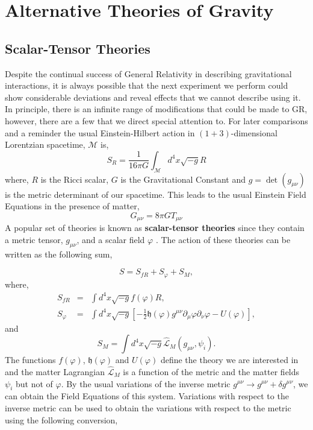 \chapter{Alternative Theories of Gravity}
\section{Scalar-Tensor Theories}
Despite the continual success of General Relativity in describing gravitational interactions, it is always possible that the next experiment we perform could show considerable deviations and reveal effects that we cannot describe using it. In principle, there is an infinite range of modifications that could be made to GR, however, there are a few that we direct special attention to. For later comparisons and a reminder the usual Einstein-Hilbert action in $(1+3)$-dimensional Lorentzian spacetime, $\mathcal{M}$ is,
\begin{equation}
    S_{R} = \frac{1}{16\pi G}\int_{\mathcal{M}} d^4 x\sqrt{-g}R
\end{equation}
where, $R$ is the Ricci scalar, $G$ is the Gravitational Constant and $g = \det(g_{\mu\nu})$ is the metric determinant of our spacetime. This leads to the usual Einstein Field Equations in the presence of matter, 
\begin{equation}\label{efes}
    G_{\mu\nu} = 8\pi GT_{\mu\nu}
\end{equation}
A popular set of theories is known as \textbf{scalar-tensor theories} since they contain a metric tensor, $g_{\mu\nu}$, and a scalar field $\varphi$ \citep{carrolGravity}. The action of these theories can be written as the following sum, 

\begin{equation}
    S = S_{fR} + S_{\varphi} + S_M,
\end{equation}
where,
\begin{eqnarray}\label{st-actions}
    S_{fR} &=& \int d^4x\sqrt{-g}f(\varphi)R,\\
    S_{\varphi} &=& \int d^4x\sqrt{-g}\left[-\frac{1}{2}\mathfrak{h}(\varphi)g^{\mu\nu}\partial_{\mu}\varphi\partial_{\nu}\varphi - U(\varphi)\right],
\end{eqnarray}
and 
\begin{equation}\label{matter-action}
    S_M = \int d^4x\sqrt{-g} \hat{\mathcal{L}}_M(g_{\mu\nu}, \psi_i).
\end{equation}
The functions $f(\varphi)$, $\mathfrak{h}(\varphi)$ and $U(\varphi)$ define the theory we are interested in and the matter Lagrangian $\hat{\mathcal{L}}_M$ is a function of the metric and the matter fields $\psi_i$ but not of $\varphi$. By the usual variations of the inverse metric $g^{\mu\nu} \rightarrow g^{\mu\nu}  + \delta g^{\mu\nu} $, we can obtain the Field Equations of this system. Variations with respect to the inverse metric can be used to obtain the variations with respect to the metric using the following conversion,

